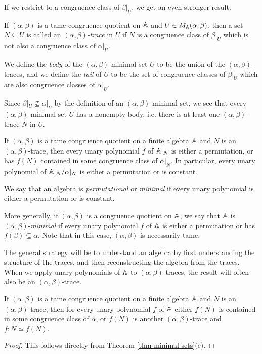 \begin{appendices}
If we restrict to a congruence class of $\beta|_U$, we get an even stronger result.

\begin{defn} If $(\alpha,\beta)$ is a tame congruence quotient on $\mathbb{A}$ and $U \in M_{\mathbb{A}}(\alpha,\beta)$, then a set $N \subseteq U$ is called an $(\alpha,\beta)$-\emph{trace} in $U$ if $N$ is a congruence class of $\beta|_U$ which is not also a congruence class of $\alpha|_U$.

We define the \emph{body} of the $(\alpha,\beta)$-minimal set $U$ to be the union of the $(\alpha,\beta)$-traces, and we define the \emph{tail} of $U$ to be the set of congruence classes of $\beta|_U$ which are also congruence classes of $\alpha|_U$.
\end{defn}

Since $\beta|_U \not\subseteq \alpha|_U$ by the definition of an $(\alpha,\beta)$-minimal set, we see that every $(\alpha,\beta)$-minimal set $U$ has a nonempty body, i.e. there is at least one $(\alpha,\beta)$-trace $N$ in $U$.

\begin{cor}\label{cor-trace-permutational} If $(\alpha,\beta)$ is a tame congruence quotient on a finite algebra $\mathbb{A}$ and $N$ is an $(\alpha,\beta)$-trace, then every unary polynomial $f$ of $\mathbb{A}|_N$ is either a permutation, or has $f(N)$ contained in some congruence class of $\alpha|_N$. In particular, every unary polynomial of $\mathbb{A}|_N/\alpha|_N$ is either a permutation or is constant.
\end{cor}

\begin{defn} We say that an algebra is \emph{permutational} or \emph{minimal} if every unary polynomial is either a permutation or is constant.

More generally, if $(\alpha,\beta)$ is a congruence quotient on $\mathbb{A}$, we say that $\mathbb{A}$ is $(\alpha,\beta)$-\emph{minimal} if every unary polynomial $f$ of $\mathbb{A}$ is either a permutation or has $f(\beta) \subseteq \alpha$. Note that in this case, $(\alpha,\beta)$ is necessarily tame.
\end{defn}

The general strategy will be to understand an algebra by first understanding the structure of the traces, and then reconstructing the algebra from the traces. When we apply unary polynomials of $\mathbb{A}$ to $(\alpha,\beta)$-traces, the result will often also be an $(\alpha,\beta)$-trace.

\begin{cor}\label{cor-trace-iso} If $(\alpha,\beta)$ is a tame congruence quotient on a finite algebra $\mathbb{A}$ and $N$ is an $(\alpha,\beta)$-trace, then for every unary polynomial $f$ of $\mathbb{A}$ either $f(N)$ is contained in some congruence class of $\alpha$, or $f(N)$ is another $(\alpha,\beta)$-trace and $f : N \simeq f(N)$.
\end{cor}
\begin{proof} This follows directly from Theorem \ref{thm-minimal-sets}(e).
\end{proof}


\end{appendices}
